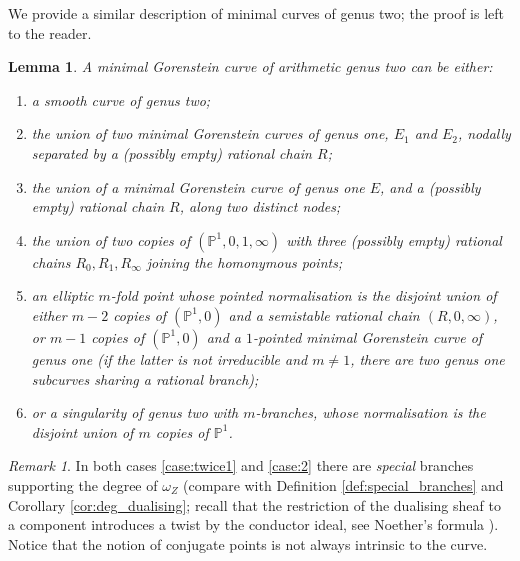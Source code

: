 \documentclass{compositio}
\newcommand{\PP}{\mathbb P}
\theoremstyle{plain}
\newtheorem{lem}[thm]{Lemma}
\theoremstyle{definition}
\theoremstyle{remark}
\newtheorem{rem}[thm]{Remark}
\begin{document}
We provide a similar description of minimal curves of genus two; the proof is left to the reader.
\begin{lem}\label{lem:min2}
 A minimal Gorenstein curve of arithmetic genus two can be either:
 \begin{enumerate}
  \item a smooth curve of genus two;
  \item the union of two minimal Gorenstein curves of genus one, $E_1$ and $E_2$, nodally separated by a (possibly empty) rational chain $R$;
  \item the union of a minimal Gorenstein curve of genus one $E$, and a (possibly empty) rational chain $R$, along two distinct nodes;
  \item the union of two copies of $(\PP^1,0,1,\infty)$ with three (possibly empty) rational chains $R_0, R_1, R_\infty$ joining the homonymous points;
  \item\label{case:twice1} an elliptic $m$-fold point whose pointed normalisation is the disjoint union of either $m-2$ copies of $(\PP^1,0)$ and a semistable rational chain $(R,0,\infty)$, or $m-1$ copies of $(\PP^1,0)$ and a $1$-pointed minimal Gorenstein curve of genus one (if the latter is not irreducible and $m\neq 1$, there are two genus one subcurves sharing a rational branch);
  \item\label{case:2} or a singularity of genus two with $m$-branches, whose normalisation is the disjoint union of $m$ copies of $\PP^1$.
 \end{enumerate}

\end{lem}

\begin{rem}\label{rem:special}
In both cases \eqref{case:twice1} and \eqref{case:2} there are \emph{special} branches supporting the degree of $\omega_Z$ (compare with Definition \ref{def:special_branches} and Corollary \ref{cor:deg_dualising}; recall that the restriction of the dualising sheaf to a component introduces a twist by the conductor ideal, see Noether's formula \cite[Proposition 1.2]{Catanese}). Notice that the notion of conjugate points is not always intrinsic to the curve.
\end{rem}
\end{document}
